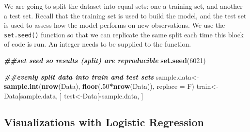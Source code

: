 \documentclass[
]{book}
\newenvironment{Shaded}{\begin{snugshade}}{\end{snugshade}}
\newcommand{\AttributeTok}[1]{\textcolor[rgb]{0.13,0.29,0.53}{#1}}
\newcommand{\DecValTok}[1]{\textcolor[rgb]{0.00,0.00,0.81}{#1}}
\newcommand{\DocumentationTok}[1]{\textcolor[rgb]{0.56,0.35,0.01}{\textbf{\textit{#1}}}}
\newcommand{\FunctionTok}[1]{\textcolor[rgb]{0.13,0.29,0.53}{\textbf{#1}}}
\newcommand{\NormalTok}[1]{#1}
\newcommand{\OtherTok}[1]{\textcolor[rgb]{0.56,0.35,0.01}{#1}}
\newcommand{\SpecialCharTok}[1]{\textcolor[rgb]{0.81,0.36,0.00}{\textbf{#1}}}
\begin{document}
\begin{Shaded}
\end{Shaded}

We are going to split the dataset into equal sets: one a training set, and another a test set. Recall that the training set is used to build the model, and the test set is used to assess how the model performs on new observations. We use the \texttt{set.seed()} function so that we can replicate the same split each time this block of code is run. An integer needs to be supplied to the function.

\begin{Shaded}
\begin{Highlighting}[]
\DocumentationTok{\#\#set seed so results (split) are reproducible}
\FunctionTok{set.seed}\NormalTok{(}\DecValTok{6021}\NormalTok{)}

\DocumentationTok{\#\#evenly split data into train and test sets}
\NormalTok{sample.data}\OtherTok{\textless{}{-}}\FunctionTok{sample.int}\NormalTok{(}\FunctionTok{nrow}\NormalTok{(Data), }\FunctionTok{floor}\NormalTok{(.}\DecValTok{50}\SpecialCharTok{*}\FunctionTok{nrow}\NormalTok{(Data)), }\AttributeTok{replace =}\NormalTok{ F)}
\NormalTok{train}\OtherTok{\textless{}{-}}\NormalTok{Data[sample.data, ]}
\NormalTok{test}\OtherTok{\textless{}{-}}\NormalTok{Data[}\SpecialCharTok{{-}}\NormalTok{sample.data, ]}
\end{Highlighting}
\end{Shaded}

\hypertarget{visualizations-with-logistic-regression}{%
\subsection*{Visualizations with Logistic Regression}\label{visualizations-with-logistic-regression}}
\end{document}
